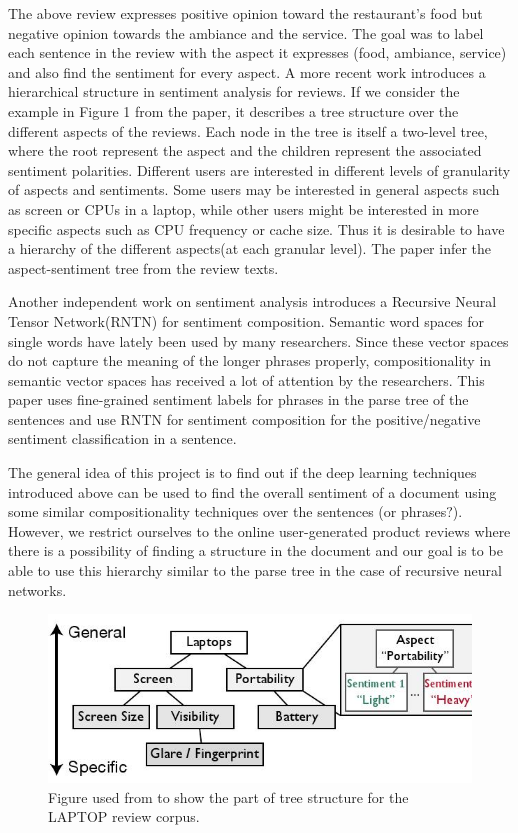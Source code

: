 \documentclass{article}
\begin{document}
The above review expresses positive opinion toward the restaurant's food but negative opinion towards the ambiance and the service. The goal was to label each sentence in the review with the aspect it expresses (food, ambiance, service) and also find the sentiment for every aspect. A more recent work \cite{Kim} introduces a hierarchical structure in sentiment analysis for reviews. If we consider the example in Figure 1 from the paper, it describes a tree structure over the different aspects of the reviews. Each node in the tree is itself a two-level tree, where the root represent the aspect and the children represent the associated sentiment polarities. Different users are interested in different levels of granularity of aspects and sentiments. Some users may be interested in general aspects such as screen or CPUs in a laptop, while other users might be interested in more specific aspects such as CPU frequency or cache size. Thus it is desirable to have a hierarchy of the different aspects(at each granular 
level). The paper infer the aspect-sentiment tree from the review texts.

Another independent work on sentiment analysis \cite{Socher} introduces a Recursive Neural Tensor Network(RNTN) for sentiment composition. Semantic word spaces for single words have lately been used by many researchers. Since these vector spaces do not capture the meaning of the longer phrases properly, compositionality in semantic vector spaces has received a lot of attention by the researchers. This paper uses fine-grained sentiment labels for phrases in the parse tree of the sentences and use RNTN for sentiment composition for the positive/negative sentiment classification in a sentence. 

The general idea of this project is to find out if the deep learning techniques introduced above can be used to find the overall sentiment of a document using some similar compositionality techniques over the sentences (or phrases$?$). However, we restrict ourselves to the online user-generated product reviews where there is a possibility of finding a structure in the document and our goal is to be able to use this hierarchy similar to the parse tree in the case of recursive neural networks.

\begin{figure}[ht]
\vskip 0.2in
\begin{center}
\centerline{\includegraphics[width=\columnwidth]{fig.jpeg}}
\caption{Figure used from \cite{Kim} to show the part of tree structure for the LAPTOP review corpus.}
\label{icml-historical}
\end{center}
\vskip -0.2in
\end{figure} 
\end{document}
